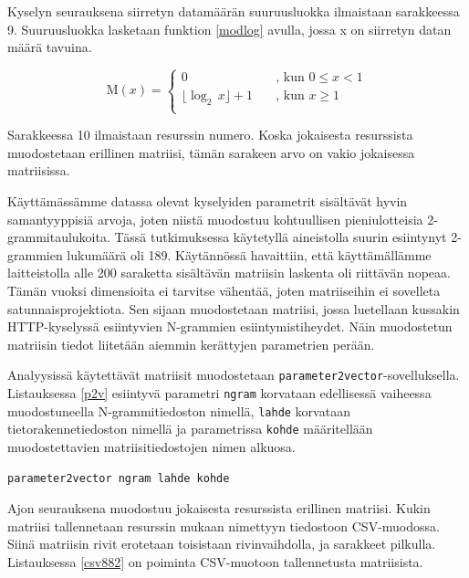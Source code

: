 Kyselyn seurauksena siirretyn datamäärän suuruusluokka ilmaistaan
sarakkeessa 9. Suuruusluokka lasketaan funktion \ref{modlog} avulla, jossa x
on siirretyn datan määrä tavuina.

\begin{equation} \label{modlog}
  \text{M}(x) = \left\{
  \begin{array}{ll}
    0 & \quad \text{, kun $0 \leq x < 1$}\\
    \lfloor \log_2 \, x \rfloor +1 & \quad \text{, kun $x \geq 1$}\\
  \end{array} \right.
\end{equation}

\vskip 0.5cm
Sarakkeessa 10 ilmaistaan resurssin numero. Koska jokaisesta
resurssista muodostetaan erillinen matriisi, tämän sarakeen arvo on
vakio jokaisessa matriisissa.


Käyttämässämme datassa olevat kyselyiden parametrit sisältävät hyvin
samantyyppisiä arvoja, joten niistä muodostuu kohtuullisen
pieniulotteisia 2-\-grammitaulukoita. Tässä tutkimuksessa käytetyllä
aineistolla suurin esiintynyt 2-grammien lukumäärä oli
189. Käytännössä havaittiin, että käyttämällämme laitteistolla alle
200 saraketta sisältävän matriisin laskenta oli riittävän
nopeaa. Tämän vuoksi dimensioita ei tarvitse vähentää, joten matriiseihin ei sovelleta
satunnaisprojektiota. Sen sijaan muodostetaan matriisi, jossa
luetellaan kussakin HTTP-kyselyssä esiintyvien N-grammien
esiintymistiheydet. Näin muodostetun matriisin tiedot liitetään
aiemmin kerättyjen parametrien perään.

Analyysissä käytettävät matriisit muodostetaan
\texttt{parameter2vector}-\-sovelluksella. Listauksessa \ref{p2v}
esiintyvä parametri \texttt{ngram} korvataan edellisessä vaiheessa
muodostuneella N-\-grammitiedoston nimellä, \texttt{lahde} korvataan
tietorakennetiedoston nimellä ja parametrissa \texttt{kohde}
määritellään muodostettavien matriisitiedostojen nimen alkuosa.

\begin{lstlisting}[float=h,language=bashshell,label=p2v,aboveskip=0.5cm,caption=Matriisien
  muodostaminen.]
parameter2vector ngram lahde kohde
\end{lstlisting} 

Ajon seurauksena muodostuu jokaisesta resurssista erillinen
matriisi. Kukin matriisi tallennetaan resurssin mukaan nimettyyn
tiedostoon CSV-muodossa. Siinä matriisin rivit erotetaan toisistaan
rivinvaihdolla, ja sarakkeet pilkulla. Listauksessa \ref{csv882} on
poiminta CSV-muotoon tallennetusta matriisista.

